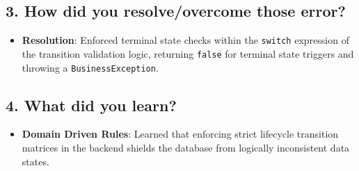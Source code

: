 \documentclass[12pt]{article}
\begin{document}
\subsection*{3. How did you resolve/overcome those error?}
\begin{itemize}
    \item \textbf{Resolution}: Enforced terminal state checks within the \texttt{switch} expression of the transition validation logic, returning \texttt{false} for terminal state triggers and throwing a \texttt{BusinessException}.
\end{itemize}

\subsection*{4. What did you learn?}
\begin{itemize}
    \item \textbf{Domain Driven Rules}: Learned that enforcing strict lifecycle transition matrices in the backend shields the database from logically inconsistent data states.
\end{itemize}
\end{document}
